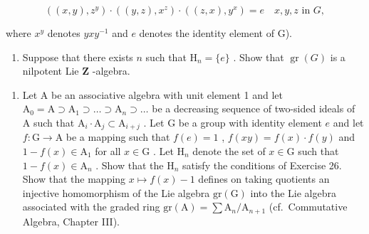 \[
((x, y), z ^ {y}) \cdot ((y, z), x ^ {z}) \cdot ((z, x), y ^ {x}) = e \quad x, y, z \text {   in   } G,
\]

where \(x^{y}\) denotes \(yxy^{-1}\) and \(e\) denotes the identity element of G).

\begin{enumerate}
\def\labelenumi{(\alph{enumi})}
\setcounter{enumi}{2}
\tightlist
\item
  Suppose that there exists \(n\) such that \(\mathrm{H}_n = \{e\}\) . Show that \(\operatorname{gr}(G)\) is a nilpotent Lie \(\mathbf{Z}\) -algebra.
\end{enumerate}

\begin{enumerate}
\def\labelenumi{\arabic{enumi}.}
\setcounter{enumi}{26}
\tightlist
\item
   Let A be an associative algebra with unit element 1 and let \(\mathrm{A}_0 = \mathrm{A} \supset \mathrm{A}_1 \supset \dots \supset \mathrm{A}_n \supset \dots\) be a decreasing sequence of two-sided ideals of A such that \(\mathrm{A}_i \cdot \mathrm{A}_j \subset \mathrm{A}_{i+j}\) . Let G be a group with identity element \(e\) and let \(f: \mathrm{G} \to \mathrm{A}\) be a mapping such that \(f(e) = 1\) , \(f(xy) = f(x) \cdot f(y)\) and \(1 - f(x) \in \mathrm{A}_1\) for all \(x \in \mathrm{G}\) . Let \(\mathrm{H}_n\) denote the set of \(x \in \mathrm{G}\) such that \(1 - f(x) \in \mathrm{A}_n\) . Show that the \(\mathrm{H}_n\) satisfy the conditions of Exercise 26. Show that the mapping \(x \mapsto f(x) - 1\) defines on taking quotients an injective homomorphism of the Lie algebra \(\mathrm{gr}(\mathrm{G})\) into the Lie algebra associated with the graded ring \(\mathrm{gr}(\mathrm{A}) = \sum \mathrm{A}_n / \mathrm{A}_{n+1}\) (cf.~Commutative Algebra, Chapter III).
\end{enumerate}

\relax{}
